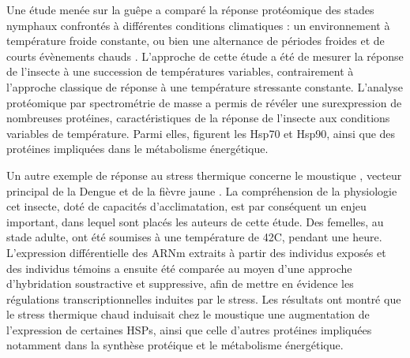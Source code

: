 		Une étude menée sur la guêpe  a comparé la réponse protéomique des stades nymphaux confrontés à différentes conditions climatiques : un environnement à température froide constante, ou bien une alternance de périodes froides et de courts évènements chauds \cite{colinet2007}.
		L'approche de cette étude a été de mesurer la réponse de l'insecte à une succession de températures variables, contrairement à l'approche classique de réponse à une température stressante constante. 
		L'analyse protéomique par spectrométrie de masse a  permis de révéler une surexpression de nombreuses protéines, caractéristiques de la réponse de l'insecte aux conditions variables de température.
		Parmi elles, figurent les Hsp70 et Hsp90,
		ainsi que des protéines impliquées dans le métabolisme énergétique.


		Un autre exemple de réponse au stress thermique concerne le moustique , vecteur principal de la Dengue et de la fièvre jaune \cite{zhao2009}.
		La compréhension de la physiologie cet insecte, doté de capacités d'acclimatation, est par conséquent un enjeu important, dans lequel sont placés les auteurs de cette étude. 
		Des femelles, au stade adulte, ont été soumises à une température de 42\textdegree{}C, pendant une heure.
		L'expression différentielle des ARNm extraits à partir des individus exposés et des individus témoins a ensuite été comparée au moyen d'une approche d'hybridation soustractive et suppressive, afin de mettre en évidence les régulations transcriptionnelles induites par le stress.
		Les résultats ont montré que le stress thermique chaud induisait chez le moustique
		une augmentation de l'expression de certaines HSPs, ainsi que celle d'autres protéines impliquées notamment dans la synthèse protéique et le métabolisme énergétique.


